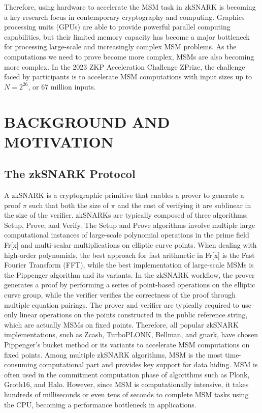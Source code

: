 \documentclass[conference]{IEEEtran}
\begin{document}
Therefore, using hardware to accelerate the MSM task in zkSNARK is becoming a key research focus in contemporary cryptography and computing. Graphics processing units (GPUs) are able to provide powerful parallel computing capabilities, but their limited memory capacity has become a major bottleneck for processing large-scale and increasingly complex MSM problems. As the computations we need to prove become more complex, MSMs are also becoming more complex. In the 2023 ZKP Acceleration Challenge ZPrize, the challenge faced by participants is to accelerate MSM computations with input sizes up to $N = 2^{26}$, or 67 million inputs.

\section{BACKGROUND AND MOTIVATION}
\subsection{The zkSNARK Protocol}

A zkSNARK is a cryptographic primitive that enables a prover to generate a proof $\pi$ such that both the size of $\pi$ and the cost of verifying it are sublinear in the size of the verifier. zkSNARKs are typically composed of three algorithms: Setup, Prove, and Verify. The Setup and Prove algorithms involve multiple large computational instances of large-scale polynomial operations in the prime field Fr[x] and multi-scalar multiplications on elliptic curve points. When dealing with high-order polynomials, the best approach for fast arithmetic in Fr[x] is the Fast Fourier Transform (FFT), while the best implementation of large-scale MSMs is the Pippenger algorithm and its variants. In the zkSNARK workflow, the prover generates a proof by performing a series of point-based operations on the elliptic curve group, while the verifier verifies the correctness of the proof through multiple equation pairings. The prover and verifier are typically required to use only linear operations on the points constructed in the public reference string, which are actually MSMs on fixed points. Therefore, all popular zkSNARK implementations, such as Zcash, TurboPLONK, Bellman, and gnark, have chosen Pippenger's bucket method or its variants to accelerate MSM computations on fixed points. Among multiple zkSNARK algorithms, MSM is the most time-consuming computational part and provides key support for data hiding. MSM is often used in the commitment computation phase of algorithms such as Plonk, Groth16, and Halo. However, since MSM is computationally intensive, it takes hundreds of milliseconds or even tens of seconds to complete MSM tasks using the CPU, becoming a performance bottleneck in applications.
\end{document}
